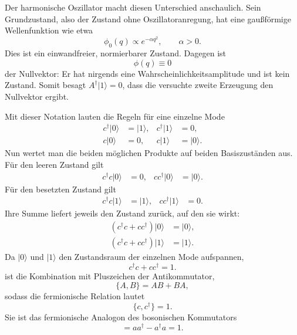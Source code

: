 Der harmonische Oszillator macht diesen Unterschied anschaulich. Sein Grundzustand, also der Zustand ohne Oszillatoranregung, hat eine gaußförmige Wellenfunktion wie etwa
\begin{equation}
\phi_0(q)\propto e^{-\alpha q^2},
\qquad \alpha>0.
\end{equation}
Dies ist ein einwandfreier, normierbarer Zustand. Dagegen ist
\begin{equation}
\phi(q)\equiv0
\end{equation}
der Nullvektor: Er hat nirgends eine Wahrscheinlichkeitsamplitude und ist kein Zustand. Somit besagt \(A^\dagger|1\rangle=0\), dass die versuchte zweite Erzeugung den Nullvektor ergibt.

\begin{classroomqa}
\end{classroomqa}

Mit dieser Notation lauten die Regeln für eine einzelne Mode
\begin{align}
c^\dagger|0\rangle&=|1\rangle,
&c^\dagger|1\rangle&=0,
\\
c|0\rangle&=0,
&c|1\rangle&=|0\rangle.
\end{align}
Nun wertet man die beiden möglichen Produkte auf beiden Basiszuständen aus. Für den leeren Zustand gilt
\begin{align}
c^\dagger c|0\rangle&=0,
&
cc^\dagger|0\rangle&=|0\rangle.
\end{align}
Für den besetzten Zustand gilt
\begin{align}
c^\dagger c|1\rangle&=|1\rangle,
&
cc^\dagger|1\rangle&=0.
\end{align}
Ihre Summe liefert jeweils den Zustand zurück, auf den sie wirkt:
\begin{align}
(c^\dagger c+cc^\dagger)|0\rangle&=|0\rangle,
\\
(c^\dagger c+cc^\dagger)|1\rangle&=|1\rangle.
\end{align}
Da \(|0\rangle\) und \(|1\rangle\) den Zustandsraum der einzelnen Mode aufspannen,
\begin{equation}
c^\dagger c+cc^\dagger=1.
\end{equation}
ist die Kombination mit Pluszeichen der Antikommutator,
\begin{equation}
\{A,B\}=AB+BA,
\end{equation}
sodass die fermionische Relation lautet
\begin{equation}
\{c,c^\dagger\}=1.
\end{equation}
Sie ist das fermionische Analogon des bosonischen Kommutators
\begin{equation}
[a,a^\dagger]=aa^\dagger-a^\dagger a=1.
\end{equation}

